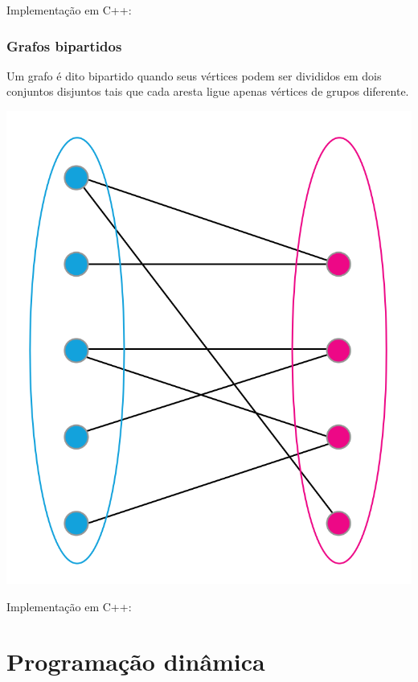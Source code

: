 \documentclass[a4paper,12pt]{article}
\begin{document}
\noindent Implementação em C++:


\subsubsection{Grafos bipartidos}
Um grafo é dito bipartido quando seus vértices podem ser divididos em dois conjuntos disjuntos tais que cada aresta ligue apenas vértices de grupos diferente.

\begin{center}
  \includegraphics[width=\linewidth/2]{figures/grafos/grafos_bipartidos.png}
\end{center}

\noindent Implementação em C++:

\newpage

\section{Programação dinâmica}
\end{document}
